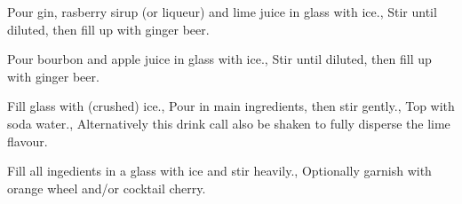\documentclass[../main.tex]{subfiles}
\begin{document}
{}
{
    {Pour gin, rasberry sirup (or liqueur) and lime juice in glass with ice.},
    {Stir until diluted, then fill up with ginger beer.}
}

\cocktailDivider

{}
{
    {Pour bourbon and apple juice in glass with ice.},
    {Stir until diluted, then fill up with ginger beer.}
}

\cocktailDivider

{}
{
    {Fill glass with (crushed) ice.},
    {Pour in main ingredients, then stir gently.}, 
    {Top with soda water.},
    {Alternatively this drink call also be shaken to fully disperse the lime flavour.}
}

\cocktailDivider

{}
{
    Fill all ingedients in a glass with ice and stir heavily.,
    Optionally garnish with orange wheel and/or cocktail cherry.
}
\end{document}
